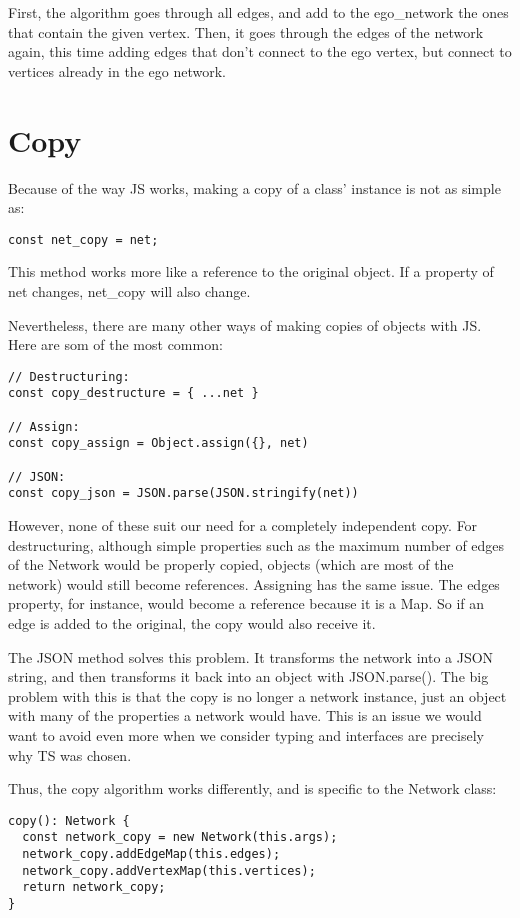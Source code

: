 First, the algorithm goes through all edges, and add to the ego\_network the ones that contain the given vertex.
Then, it goes through the edges of the network again, this time adding edges that don't connect to the ego vertex,
but connect to vertices already in the ego network.

\section{Copy}

Because of the way JS works, making a copy of a class' instance is not as simple as:
\begin{verbatim}
const net_copy = net;
\end{verbatim}

This method works more like a reference to the original object.
If a property of net changes, net\_copy will also change.

Nevertheless, there are many other ways of making copies of objects with JS.
Here are som of the most common:
\begin{verbatim}
// Destructuring:
const copy_destructure = { ...net }

// Assign:
const copy_assign = Object.assign({}, net)

// JSON:
const copy_json = JSON.parse(JSON.stringify(net))
\end{verbatim}

However, none of these suit our need for a completely independent copy.
For destructuring, although simple properties such as the maximum number of edges of the Network would be properly copied,
objects (which are most of the network) would still become references.
Assigning has the same issue.
The edges property, for instance, would become a reference because it is a Map.
So if an edge is added to the original, the copy would also receive it.

The JSON method solves this problem.
It transforms the network into a JSON string, and then transforms it back into an object with JSON.parse().
The big problem with this is that the copy is no longer a network instance, just an object with many of the properties a network would have.
This is an issue we would want to avoid even more when we consider typing and interfaces are precisely why TS was chosen.

Thus, the copy algorithm works differently, and is specific to the Network class:

\begin{verbatim}
copy(): Network {
  const network_copy = new Network(this.args);
  network_copy.addEdgeMap(this.edges);
  network_copy.addVertexMap(this.vertices);
  return network_copy;
}
\end{verbatim}

